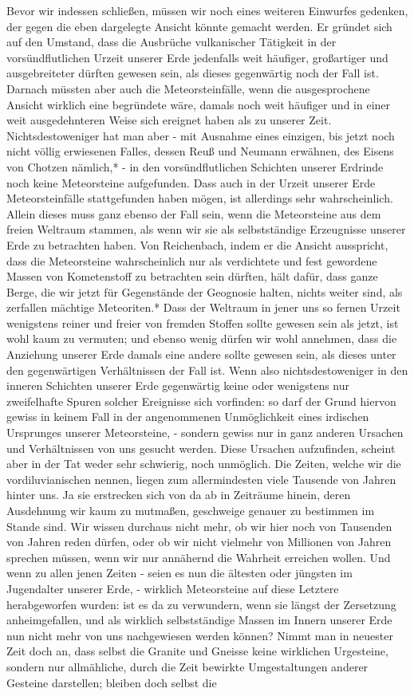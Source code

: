 \documentclass[a4paper, 11pt, oneside, polutonikogreek, german]{article}
\begin{document}
Bevor wir indessen schließen, müssen wir noch eines weiteren Einwurfes gedenken, der gegen die eben dargelegte Ansicht könnte gemacht werden. Er gründet sich auf den Umstand, dass die Ausbrüche vulkanischer Tätigkeit in der vorsündflutlichen Urzeit unserer Erde jedenfalls weit häufiger, großartiger und ausgebreiteter dürften gewesen sein, als dieses gegenwärtig noch der Fall ist. Darnach müssten aber auch die Meteorsteinfälle, wenn die ausgesprochene Ansicht wirklich eine begründete wäre, damals noch weit häufiger und in einer weit ausgedehnteren Weise sich ereignet haben als zu unserer Zeit. Nichtsdestoweniger hat man aber - mit Ausnahme eines einzigen, bis jetzt noch nicht völlig erwiesenen Falles, dessen Reuß und Neumann erwähnen, des Eisens von Chotzen nämlich,* - in den vorsündflutlichen Schichten unserer Erdrinde noch keine Meteorsteine aufgefunden. Dass auch in der Urzeit unserer Erde Meteorsteinfälle stattgefunden haben mögen, ist allerdings sehr wahrscheinlich. Allein dieses muss ganz ebenso der Fall sein, wenn die Meteorsteine aus dem freien Weltraum stammen, als wenn wir sie als selbstständige Erzeugnisse unserer Erde zu betrachten haben. Von Reichenbach, indem er die Ansicht ausspricht, dass die Meteorsteine wahrscheinlich nur als verdichtete und fest gewordene Massen von Kometenstoff zu betrachten sein dürften, hält dafür, dass ganze Berge, die wir jetzt für Gegenstände der Geognosie halten, nichts weiter sind, als zerfallen mächtige Meteoriten.* Dass der Weltraum in jener uns so fernen Urzeit wenigstens reiner und freier von fremden Stoffen sollte gewesen sein als jetzt, ist wohl kaum zu vermuten; und ebenso wenig dürfen wir wohl annehmen, dass die Anziehung unserer Erde damals eine andere sollte gewesen sein, als dieses unter den gegenwärtigen Verhältnissen der Fall ist. Wenn also nichtsdestoweniger in den inneren Schichten unserer Erde gegenwärtig keine oder wenigstens nur zweifelhafte Spuren solcher Ereignisse sich vorfinden: so darf der Grund hiervon gewiss in keinem Fall in der angenommenen Unmöglichkeit eines irdischen Ursprunges unserer Meteorsteine, - sondern gewiss nur in ganz anderen Ursachen und Verhältnissen von uns gesucht werden. Diese Ursachen aufzufinden, scheint aber in der Tat weder sehr schwierig, noch unmöglich. Die Zeiten, welche wir die vordiluvianischen nennen, liegen zum allermindesten viele Tausende von Jahren hinter uns. Ja sie erstrecken sich von da ab in Zeiträume hinein, deren Ausdehnung wir kaum zu mutmaßen, geschweige genauer zu bestimmen im Stande sind. Wir wissen durchaus nicht mehr, ob wir hier noch von Tausenden von Jahren reden dürfen, oder ob wir nicht vielmehr von Millionen von Jahren sprechen müssen, wenn wir nur annähernd die Wahrheit erreichen wollen. Und wenn zu allen jenen Zeiten - seien es nun die ältesten oder jüngsten im Jugendalter unserer Erde, - wirklich Meteorsteine auf diese Letztere herabgeworfen wurden: ist es da zu verwundern, wenn sie längst der Zersetzung anheimgefallen, und als wirklich selbstständige Massen im Innern unserer Erde nun nicht mehr von uns nachgewiesen werden können? Nimmt man in neuester Zeit doch an, dass selbst die Granite und Gneisse keine wirklichen Urgesteine, sondern nur allmähliche, durch die Zeit bewirkte Umgestaltungen anderer Gesteine darstellen; bleiben doch selbst die 
\end{document}
